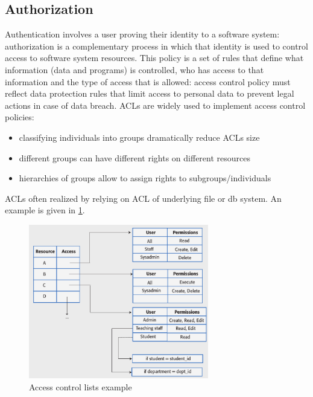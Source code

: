 \documentclass[10pt,a4paper]{report}
\begin{document}
\subsection{Authorization}
Authentication involves a user proving their identity to a software system: authorization is a complementary process in which that identity is used to control access to software system resources. 
This policy is a set of rules that define what information (data and programs) is controlled, who has access to that information and the type of access that is allowed: access control policy must reflect data protection rules that limit access to personal data to prevent legal actions in case of data breach. ACLs are widely used to implement access control policies:
\begin{itemize}
	\item classifying individuals into groups dramatically reduce ACLs size
	\item different groups can have different rights on different resources
	\item hierarchies of groups allow to assign rights to subgroups/individuals
	
\end{itemize}
ACLs often realized by relying on ACL of underlying file or db system. An example is given in \ref{image87}. 
\begin{figure}[h]
	\centering
	\includegraphics[width=0.7\textwidth]{image87}
	\caption{Access control lists example}
	\label{image87}
\end{figure} 
\end{document}
